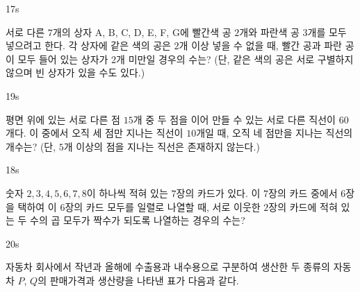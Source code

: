 \documentclass[10pt]{article}
\begin{document}
\begin{pagepair}
\noindent
\begin{minipage}[t][\probboxheight][t]{0.46\linewidth}
\begin{problem}{17}{s}
\par\smallskip
서로 다른 $7$개의 상자 A, B, C, D, E, F, G에 빨간색 공 $2$개와 파란색 공 $3$개를 모두 넣으려고 한다. 각 상자에 같은 색의 공은 $2$개 이상 넣을 수 없을 때, 빨간 공과 파란 공이 모두 들어 있는 상자가 $2$개 미만일 경우의 수는? (단, 같은 색의 공은 서로 구별하지 않으며 빈 상자가 있을 수도 있다.)
\begin{choices}
\end{choices}
\end{problem}
\end{minipage}\hfill
\begin{minipage}[t][\probboxheight][t]{0.46\linewidth}
\begin{problem}{19}{s}
\par\smallskip
평면 위에 있는 서로 다른 점 $15$개 중 두 점을 이어 만들 수 있는 서로 다른 직선이 $60$개다. 이 중에서 오직 세 점만 지나는 직선이 $10$개일 때, 오직 네 점만을 지나는 직선의 개수는? (단, $5$개 이상의 점을 지나는 직선은 존재하지 않는다.)
\begin{choices}
\end{choices}
\end{problem}
\end{minipage}
\par\vspace{4mm}
\noindent
\begin{minipage}[t][\probboxheight][t]{0.46\linewidth}
\begin{problem}{18}{s}
\par\smallskip
숫자 $2, 3, 4, 5, 6, 7, 8$이 하나씩 적혀 있는 $7$장의 카드가 있다. 이 $7$장의 카드 중에서 $6$장을 택하여 이 $6$장의 카드 모두를 일렬로 나열할 때, 서로 이웃한 $2$장의 카드에 적혀 있는 두 수의 곱 모두가 짝수가 되도록 나열하는 경우의 수는?
\begin{choices}
\end{choices}
\end{problem}
\end{minipage}\hfill
\begin{minipage}[t][\probboxheight][t]{0.46\linewidth}
\begin{problem}{20}{s}
\par\smallskip
자동차 회사에서 작년과 올해에 수출용과 내수용으로 구분하여 생산한 두 종류의 자동차 $P$, $Q$의 판매가격과 생산량을 나타낸 표가 다음과 같다.


\end{problem}
\end{minipage}
\end{pagepair}
\end{document}
